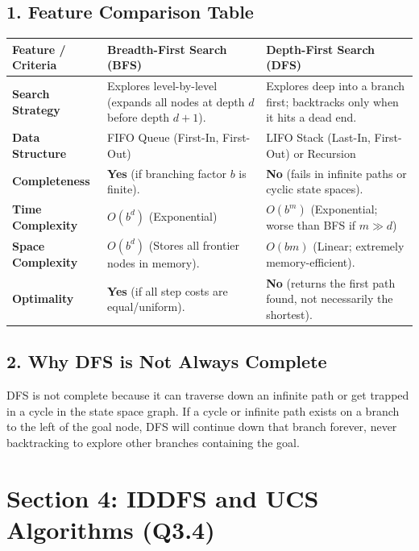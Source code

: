 \subsection{1. Feature Comparison Table}

\begin{table}[H]
\centering
\begin{tabular}{|p{}|p{}|p{}|}
\hline
Feature / Criteria & Breadth-First Search (BFS) & Depth-First Search (DFS) \\
\hline
\textbf{Search Strategy} & Explores level-by-level (expands all nodes at depth $d$ before depth $d+1$). & Explores deep into a branch first; backtracks only when it hits a dead end. \\
\hline
\textbf{Data Structure} & FIFO Queue (First-In, First-Out) & LIFO Stack (Last-In, First-Out) or Recursion \\
\hline
\textbf{Completeness} & \textbf{Yes} (if branching factor $b$ is finite). & \textbf{No} (fails in infinite paths or cyclic state spaces). \\
\hline
\textbf{Time Complexity} & $O(b^d)$ (Exponential) & $O(b^m)$ (Exponential; worse than BFS if $m \gg d$) \\
\hline
\textbf{Space Complexity} & $O(b^d)$ (Stores all frontier nodes in memory). & $O(bm)$ (Linear; extremely memory-efficient). \\
\hline
\textbf{Optimality} & \textbf{Yes} (if all step costs are equal/uniform). & \textbf{No} (returns the first path found, not necessarily the shortest). \\
\hline
\end{tabular}
\end{table}

\subsection{2. Why DFS is Not Always Complete}
DFS is not complete because it can traverse down an infinite path or get trapped in a cycle in the state space graph. If a cycle or infinite path exists on a branch to the left of the goal node, DFS will continue down that branch forever, never backtracking to explore other branches containing the goal.


\section{Section 4: IDDFS and UCS Algorithms (Q3.4)}

